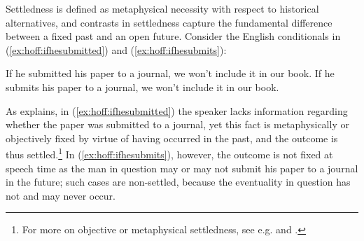 \documentclass[output=paper,colorlinks,citecolor=brown]{langscibook}
\begin{document}
Settledness is defined as metaphysical necessity with respect to historical alternatives, and contrasts in settledness capture the fundamental difference between a fixed past and an open future. Consider the English conditionals in (\ref{ex:hoff:ifhesubmitted}) and (\ref{ex:hoff:ifhesubmits}):

\begin{exe}
\ex
\begin{xlist}
	\ex\label{ex:hoff:ifhesubmitted} If he submitted his paper to a journal, we won’t include it in our book.
	\ex\label{ex:hoff:ifhesubmits} If he submits his paper to a journal, we won’t include it in our book.
\end{xlist}
	\citep[1]{Kaufmann2002}
\end{exe}

As \citet{Kaufmann2002} explains, in (\ref{ex:hoff:ifhesubmitted}) the speaker lacks information regarding whether the paper was submitted to a journal, yet this fact is metaphysically or objectively fixed by virtue of having occurred in the past, and the outcome is thus settled.\footnote{For more on objective or metaphysical settledness, see e.g. \citet{Condoravdi2002} and \citet{Mari2013}.} In (\ref{ex:hoff:ifhesubmits}), however, the outcome is not fixed at speech time as the man in question may or may not submit his paper to a journal in the future; such cases are non-settled, because the eventuality in question has not and may never occur. 
\end{document}
